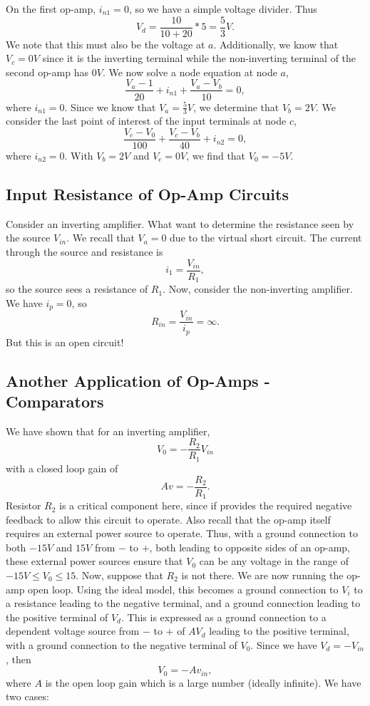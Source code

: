 \documentclass[11pt]{article}
\theoremstyle{plain} %
\theoremstyle{definition}
\theoremstyle{example}
\theoremstyle{remark}
\begin{document}
On the first op-amp, $i_{n1} = 0$, so we have a simple voltage divider. Thus
$$V_d = \frac{10}{10+20}*5 = \frac{5}{3}V.$$ We note that this must also be the voltage at $a$. Additionally, we know that $V_c=0V$ since it is the inverting terminal while the non-inverting terminal of the second op-amp has $0V$. We now solve a node equation at node $a$,
$$\frac{V_a-1}{20} + i_{n1} + \frac{V_a-V_b}{10} = 0,$$
where $i_{n1} = 0$. Since we know that $V_a = \frac{5}{3}V$, we determine that $V_b = 2V$. We consider the last point of interest of the input terminals at node $c$, 
$$\frac{V_c-V_0}{100} + \frac{V_c-V_b}{40} + i_{n2} = 0,$$
where $i_{n2} = 0$. With $V_b=2V$ and $V_c=0V$, we find that $V_0 = -5V$.

\subsection{Input Resistance of Op-Amp Circuits}

Consider an inverting amplifier. What want to determine the resistance seen by the source $V_{in}$. We recall that $V_a = 0$ due to the virtual short circuit. The current through the source and resistance is 
$$i_1 = \frac{V_{in}}{R_1},$$
so the source sees a resistance of $R_1$. Now, consider the non-inverting amplifier. We have $i_p = 0$, so 
$$R_{in} = \frac{V_{in}}{i_p} = \infty.$$
But this is an open circuit!

\subsection{Another Application of Op-Amps - Comparators}

We have shown that for an inverting amplifier, 
$$V_0 = -\frac{R_2}{R_1}V_{in}$$
with a closed loop gain of 
$$Av = -\frac{R_2}{R_1}.$$
Resistor $R_2$ is a critical component here, since if provides the required negative feedback to allow this circuit to operate. Also recall that the op-amp itself requires an external power source to operate. Thus, with a ground connection to both $-15V$ and $15V$ from $-$ to $+$, both leading to opposite sides of an op-amp, these external power sources ensure that $V_0$ can be any voltage in the range of $-15V \leq V_0 \leq 15$. Now, suppose that $R_2$ is not there. We are now running the op-amp open loop. Using the ideal model, this becomes a ground connection to $V_{i}$ to a resistance leading to the negative terminal, and a ground connection leading to the positive terminal of $V_d$. This is expressed as a ground connection to a dependent voltage source from $-$ to $+$ of $AV_d$ leading to the positive terminal, with a ground connection to the negative terminal of $V_0$. Since we have $V_d = -V_{in}$, then 
$$V_0 = -Av_{in},$$
where $A$ is the open loop gain which is a large number (ideally infinite). We have two cases:
\end{document}
